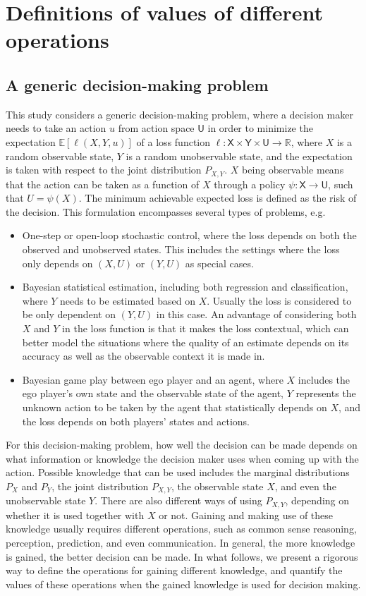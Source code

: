 \documentclass{article}
\newcommand{\R}{\mathbb{R}}
\newcommand{\E}{\mathbb{E}}
\def\sU{{\mathsf U}}
\def\sX{{\mathsf X}}
\def\sY{{\mathsf Y}}
\begin{document}
\section{Definitions of values of different operations}\label{sec:formulation}
\subsection{A generic decision-making problem}
This study considers a generic decision-making problem, where a decision maker needs to take an action $u$ from action space $\sU$ in order to minimize the expectation $\E[\ell(X,Y,u)]$ of a loss function $\ell:\sX\times\sY\times\sU\rightarrow\R$, where $X$ is a random observable state, $Y$ is a random unobservable state, and the expectation is taken with respect to the joint distribution $P_{X,Y}$.
$X$ being observable means that the action can be taken as a function of $X$ through a policy $\psi:\sX\rightarrow\sU$, such that $U = \psi(X)$.
The minimum achievable expected loss is defined as the risk of the decision.
This formulation encompasses several types of problems, e.g.
\begin{itemize}[leftmargin=*]%
\item
One-step or open-loop stochastic control, where the loss depends on both the observed and unobserved states. This includes the settings where the loss only depends on $(X,U)$ or $(Y,U)$ as special cases.
\item 
Bayesian statistical estimation, including both regression and classification, where $Y$ needs to be estimated based on $X$. Usually the loss is considered to be only dependent on $(Y,U)$ in this case. An advantage of considering both $X$ and $Y$ in the loss function is that it makes the loss contextual, which can better model the situations where the quality of an estimate depends on its accuracy as well as the observable context it is made in.
\item 
Bayesian game play \cite{harsanyi1967i} between ego player and an agent, where $X$ includes the ego player's own state and the observable state of the agent, $Y$ represents the unknown action to be taken by the agent that statistically depends on $X$, and the loss depends on both players' states and actions.
\end{itemize}
For this decision-making problem, how well the decision can be made depends on what information or knowledge the decision maker uses when coming up with the action. Possible knowledge that can be used includes the marginal distributions $P_X$ and $P_Y$, the joint distribution $P_{X,Y}$, the observable state $X$, and even the unobservable state $Y$. There are also different ways of using $P_{X,Y}$, depending on whether it is used together with $X$ or not.
Gaining and making use of these knowledge usually requires different operations, such as common sense reasoning, perception, prediction, and even communication. In general, the more knowledge is gained, the better decision can be made.
In what follows, we present a rigorous way to define the operations for gaining different knowledge, and quantify the values of these operations when the gained knowledge is used for decision making.
\end{document}
